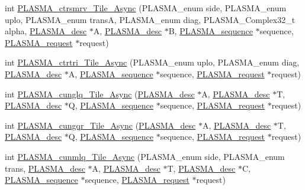 \begin{DoxyCompactItemize}
\item 
int \hyperlink{group__PLASMA__Complex32__t__Tile__Async_ga7484ac3a69bdea60ff4309849cb084c3_ga7484ac3a69bdea60ff4309849cb084c3}{P\+L\+A\+S\+M\+A\+\_\+ctrsmrv\+\_\+\+Tile\+\_\+\+Async} (P\+L\+A\+S\+M\+A\+\_\+enum side, P\+L\+A\+S\+M\+A\+\_\+enum uplo, P\+L\+A\+S\+M\+A\+\_\+enum trans\+A, P\+L\+A\+S\+M\+A\+\_\+enum diag, P\+L\+A\+S\+M\+A\+\_\+\+Complex32\+\_\+t alpha, \hyperlink{structplasma__desc__t}{P\+L\+A\+S\+M\+A\+\_\+desc} $\ast$A, \hyperlink{structplasma__desc__t}{P\+L\+A\+S\+M\+A\+\_\+desc} $\ast$B, \hyperlink{structplasma__sequence__t}{P\+L\+A\+S\+M\+A\+\_\+sequence} $\ast$sequence, \hyperlink{structplasma__request__t}{P\+L\+A\+S\+M\+A\+\_\+request} $\ast$request)
\item 
int \hyperlink{group__PLASMA__Complex32__t__Tile__Async_ga103aeadf56f58e32ed06f5287d1132c1_ga103aeadf56f58e32ed06f5287d1132c1}{P\+L\+A\+S\+M\+A\+\_\+ctrtri\+\_\+\+Tile\+\_\+\+Async} (P\+L\+A\+S\+M\+A\+\_\+enum uplo, P\+L\+A\+S\+M\+A\+\_\+enum diag, \hyperlink{structplasma__desc__t}{P\+L\+A\+S\+M\+A\+\_\+desc} $\ast$A, \hyperlink{structplasma__sequence__t}{P\+L\+A\+S\+M\+A\+\_\+sequence} $\ast$sequence, \hyperlink{structplasma__request__t}{P\+L\+A\+S\+M\+A\+\_\+request} $\ast$request)
\item 
int \hyperlink{group__PLASMA__Complex32__t__Tile__Async_ga436e840f5545766248ef7837cfc76334_ga436e840f5545766248ef7837cfc76334}{P\+L\+A\+S\+M\+A\+\_\+cunglq\+\_\+\+Tile\+\_\+\+Async} (\hyperlink{structplasma__desc__t}{P\+L\+A\+S\+M\+A\+\_\+desc} $\ast$A, \hyperlink{structplasma__desc__t}{P\+L\+A\+S\+M\+A\+\_\+desc} $\ast$T, \hyperlink{structplasma__desc__t}{P\+L\+A\+S\+M\+A\+\_\+desc} $\ast$Q, \hyperlink{structplasma__sequence__t}{P\+L\+A\+S\+M\+A\+\_\+sequence} $\ast$sequence, \hyperlink{structplasma__request__t}{P\+L\+A\+S\+M\+A\+\_\+request} $\ast$request)
\item 
int \hyperlink{group__PLASMA__Complex32__t__Tile__Async_ga06680c853d0c7fc9b697be4db7d28474_ga06680c853d0c7fc9b697be4db7d28474}{P\+L\+A\+S\+M\+A\+\_\+cungqr\+\_\+\+Tile\+\_\+\+Async} (\hyperlink{structplasma__desc__t}{P\+L\+A\+S\+M\+A\+\_\+desc} $\ast$A, \hyperlink{structplasma__desc__t}{P\+L\+A\+S\+M\+A\+\_\+desc} $\ast$T, \hyperlink{structplasma__desc__t}{P\+L\+A\+S\+M\+A\+\_\+desc} $\ast$Q, \hyperlink{structplasma__sequence__t}{P\+L\+A\+S\+M\+A\+\_\+sequence} $\ast$sequence, \hyperlink{structplasma__request__t}{P\+L\+A\+S\+M\+A\+\_\+request} $\ast$request)
\item 
int \hyperlink{group__PLASMA__Complex32__t__Tile__Async_gadba639660ec87b31c2340da05fcc4f5d_gadba639660ec87b31c2340da05fcc4f5d}{P\+L\+A\+S\+M\+A\+\_\+cunmlq\+\_\+\+Tile\+\_\+\+Async} (P\+L\+A\+S\+M\+A\+\_\+enum side, P\+L\+A\+S\+M\+A\+\_\+enum trans, \hyperlink{structplasma__desc__t}{P\+L\+A\+S\+M\+A\+\_\+desc} $\ast$A, \hyperlink{structplasma__desc__t}{P\+L\+A\+S\+M\+A\+\_\+desc} $\ast$T, \hyperlink{structplasma__desc__t}{P\+L\+A\+S\+M\+A\+\_\+desc} $\ast$C, \hyperlink{structplasma__sequence__t}{P\+L\+A\+S\+M\+A\+\_\+sequence} $\ast$sequence, \hyperlink{structplasma__request__t}{P\+L\+A\+S\+M\+A\+\_\+request} $\ast$request)

\end{DoxyCompactItemize}
